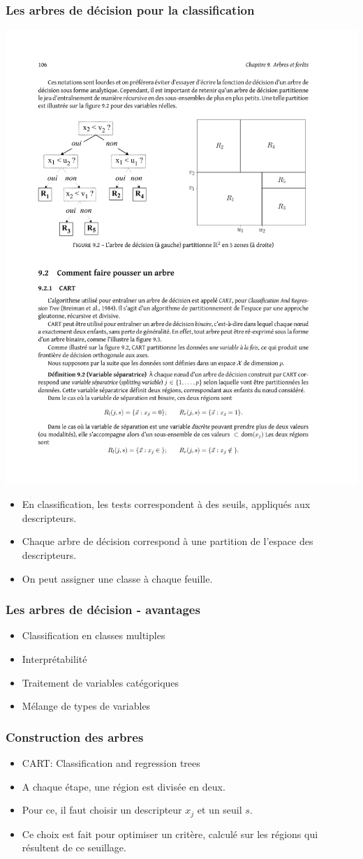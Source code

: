 \begin{frame}
  \frametitle{Les arbres de décision pour la classification}
  \begin{center}
    \includegraphics[width=.7\textwidth]{figures/arbre}
  \end{center}
  \begin{itemize}
    \item En classification, les tests correspondent à des seuils, appliqués aux descripteurs. 
    \item Chaque arbre de décision correspond à une partition de l'espace des descripteurs.
    \item On peut assigner une classe à chaque feuille. 
  \end{itemize}
\end{frame}


\begin{frame}
  \frametitle{Les arbres de décision - avantages}
  \begin{itemize}
    \item Classification en classes multiples
    \item Interprétabilité
    \item Traitement de variables catégoriques
    \item Mélange de types de variables
  \end{itemize}
\end{frame}

\begin{frame}
  \frametitle{Construction des arbres}
  \begin{itemize}
    \item CART: Classification and regression trees
    \item A chaque étape, une région est divisée en deux. 
    \item Pour ce, il faut choisir un descripteur $x_j$ et un seuil $s$. 
    \item Ce choix est fait pour optimiser un critère, calculé sur les régions qui résultent de ce seuillage. 
  \end{itemize}
\end{frame}

